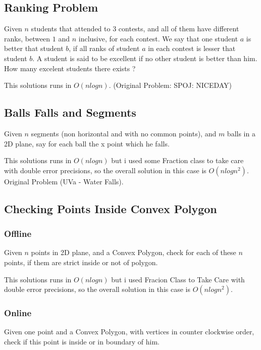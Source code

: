 \documentclass{report}
\begin{document}
        \subsection{Ranking Problem}
        Given $n$ students that attended to $3$ contests, and all of them have different ranks, between $1$ and $n$ inclusive, for each contest. We say that one student $a$ is better that student $b$, if all ranks of student $a$ in each contest is lesser that student $b$. A student is said to be excellent if no other student is better than him. How many excelent students there exists ?
        
        This solutions runs in $O(nlogn)$. (Original Problem: SPOJ: NICEDAY)
        
        
        \newpage
        \subsection{Balls Falls and Segments}
        Given $n$ segments (non horizontal and with no common points), and $m$ balls in a 2D plane, say for each ball the x point which he falls.
        
        This solutions runs in $O(nlogn)$ but i used some Fraction class to take care with double error precisions, so the overall solution in this case is $O(nlogn^2)$. Original Problem (UVa - Water Falls).
        
        
        \newpage
        \subsection{Checking Points Inside Convex Polygon}
            \subsubsection{Offline}
            Given $n$ points in 2D plane, and a Convex Polygon, check for each of these $n$ points, if them are strict inside or not of polygon.
            
            This solutions runs in $O(nlogn)$ but i used Fracion Class to Take Care with double error precisions, so the overall solution in this case is $O(nlogn^2)$.
            
            
            \newpage
            \subsubsection{Online}
            Given one point and a Convex Polygon, with vertices in counter clockwise order, check if this point is inside or in boundary of him.
            
\end{document}
